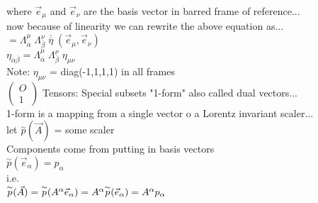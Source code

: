 \documentclass[11pt,a4paper]{article}
\begin{document}
\begin{enumerate}
\begin{enumerate}
\begin{enumerate}
			                  where $\vec{e}_\mu$ and $\vec{e}_\nu$ are the basis vector in barred frame of reference...\\
			                  now because of linearity we can rewrite the above equation as...\\
			                  $=\Lambda^{\mu}_{\overline{\alpha}}\; \Lambda^{\nu}_{\overline{\beta}}\; \overline{\overline{\eta}}\; ( \vec{e}_\mu ,  \vec{e}_\nu ) $\\
			                  $\boxed{\eta_{\overline{\alpha}\overline{\beta}} =\Lambda^{\mu}_{\overline{\alpha}}\; \Lambda^{\nu}_{\overline{\beta}}\; \eta_{\mu \nu}} $\\
			                  Note: $ \eta_{\mu \nu}$ = diag(-1,1,1,1) in all frames\\

			                  $\begin{pmatrix}
					                  O \\
					                  1
				                  \end{pmatrix}$ Tensors: Special subsets "1-form" also called dual vectors...\\
			                  1-form is a mapping from a single vector o a Lorentz invariant scaler...\\
			                  let $\overset{\sim}{p} (\vec{A})$ = some scaler\\
			                  Components come from putting in basis vectors\\
			                  $\overset{\sim}{p} (\vec{e}_{\alpha}) = p_{\alpha}$\\
			                  i.e.\\
			                  $\overset{\sim}{p} (\vec{A}) = \overset{\sim}{p} ( A^{\alpha} \vec{e}_{\alpha})\\ =  A^{\alpha} \overset{\sim}{p} ( \vec{e}_{\alpha})\\ =  A^{\alpha} p_{\alpha}$


\end{enumerate}
\end{enumerate}
\end{enumerate}
\end{document}
